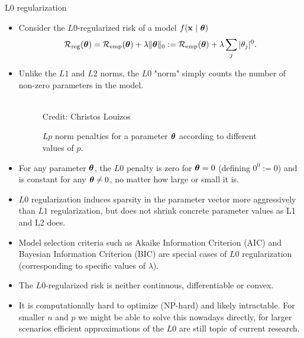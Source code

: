 \documentclass[11pt,compress,t,notes=noshow, xcolor=table]{beamer}
\begin{document}
\begin{vbframe} {L0 regularization}

  \begin{itemize}
    \item Consider the $L0$-regularized risk of a model $f(\mathbf{x} ~|~ \bm{\theta})$
  $$
  \mathcal{R}_{\text{reg}}(\bm{\theta}) = \mathcal{R}_{\text{emp}}(\bm{\theta}) + \lambda \|\bm{\theta}\|_0 := \mathcal{R}_{\text{emp}}(\bm{\theta}) + \lambda \sum_j |\theta_j|^0.
  $$
      \item Unlike the $L1$ and $L2$ norms, the $L0$ "norm" simply counts the number of non-zero parameters in the model.
    \begin{figure}
      \centering
        \tiny{\\ Credit: Christos Louizos}
        \caption{\footnotesize $Lp$ norm penalties for a parameter $\bm{\theta}$ according to different values of $p$.}
    \end{figure}
    \item For any parameter $\bm{\theta}$, the $L0$ penalty is zero for $\bm{\theta} = 0$ (defining $0^0 := 0$) and is constant for any $\bm{\theta} \neq 0$, no matter how large or small it is.
    \item $L0$ regularization induces sparsity in the parameter vector more aggressively than $L1$ regularization, but does not shrink concrete parameter values as L1 and L2 does.
    \item Model selection criteria such as Akaike Information Criterion (AIC) and Bayesian Information Criterion (BIC) are special cases of $L0$ regularization (corresponding to specific values of $\lambda$).
    \item The $L0$-regularized risk is neither continuous, differentiable or convex. 
    \item It is computationally hard to optimize (NP-hard) and likely intractable. 
      For smaller $n$ and $p$ we might be able to solve this nowadays directly, for larger scenarios efficient approximations of the $L0$ are still topic of current research.
  \end{itemize}
\end{vbframe}

\endlecture
\end{document}
